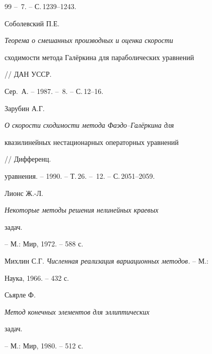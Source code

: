 \begin{thebibliography}{99}
-- \No\,7. -- С.\,1239--1243.




Соболевский П.Е. {\em Теорема о смешанных производных и оценка скорости


сходимости метода Гал\"еркина для параболических уравнений} // ДАН УССР.


Сер.~А. -- 1987. -- \No\,8. -- С.\,12--16.




Зарубин А.Г. {\em О скорости сходимости метода Фаэдо--Гал\"еркина для


квазилинейных нестационарных операторных уравнений} // Дифференц.


уравнения. -- 1990. -- Т.\,26. -- \No\,12. -- С.\,2051--2059.




Лионс Ж.-Л. {\em Некоторые методы решения нелинейных краевых


задач.} -- М.: Мир, 1972. -- 588 с.




Михлин С.Г. {\em Численная реализация вариационных методов.} -- М.:


Наука, 1966. -- 432 с.




Сьярле Ф. {\em Метод конечных элементов для эллиптических


задач.} -- М.: Мир, 1980. -- 512 с.





\end{thebibliography}





\vskip 2cm












\label{end}








